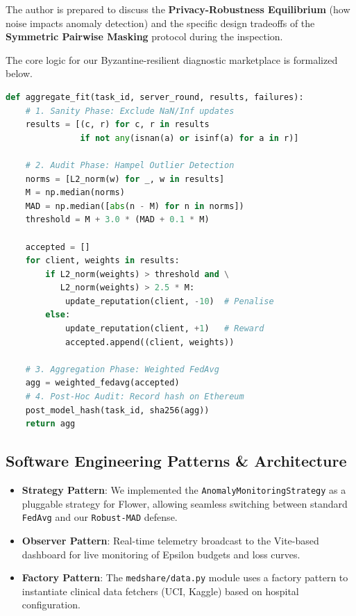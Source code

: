 \documentclass[10pt, a4paper, twocolumn]{article}
\begin{document}
The author is prepared to discuss the \textbf{Privacy-Robustness Equilibrium} (how noise impacts anomaly detection) and the specific design tradeoffs of the \textbf{Symmetric Pairwise Masking} protocol during the inspection.

The core logic for our Byzantine-resilient diagnostic marketplace is formalized below.

\begin{lstlisting}[language=Python, caption={MedShare-FL Aggregation Algorithm}]
def aggregate_fit(task_id, server_round, results, failures):
    # 1. Sanity Phase: Exclude NaN/Inf updates
    results = [(c, r) for c, r in results
               if not any(isnan(a) or isinf(a) for a in r)]
    
    # 2. Audit Phase: Hampel Outlier Detection
    norms = [L2_norm(w) for _, w in results]
    M = np.median(norms)
    MAD = np.median([abs(n - M) for n in norms])
    threshold = M + 3.0 * (MAD + 0.1 * M)
    
    accepted = []
    for client, weights in results:
        if L2_norm(weights) > threshold and \
           L2_norm(weights) > 2.5 * M:
            update_reputation(client, -10)  # Penalise
        else:
            update_reputation(client, +1)   # Reward
            accepted.append((client, weights))
    
    # 3. Aggregation Phase: Weighted FedAvg
    agg = weighted_fedavg(accepted)
    # 4. Post-Hoc Audit: Record hash on Ethereum
    post_model_hash(task_id, sha256(agg))
    return agg
\end{lstlisting}

\subsection{Software Engineering Patterns \& Architecture}
\begin{itemize}
    \item \textbf{Strategy Pattern}: We implemented the \texttt{AnomalyMonitoringStrategy} as a pluggable strategy for Flower, allowing seamless switching between standard \texttt{FedAvg} and our \texttt{Robust-MAD} defense.
    \item \textbf{Observer Pattern}: Real-time telemetry broadcast to the Vite-based dashboard for live monitoring of Epsilon budgets and loss curves.
    \item \textbf{Factory Pattern}: The \texttt{medshare/data.py} module uses a factory pattern to instantiate clinical data fetchers (UCI, Kaggle) based on hospital configuration.
\end{itemize}
\end{document}

